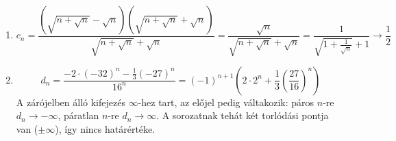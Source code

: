 \documentclass[11pt]{scrartcl}
\begin{document}
\begin{enumerate}
	\item \[
		      c_n
		      = \frac{\left(\sqrt{n + \sqrt{n}} - \sqrt{n}\right)\left(\sqrt{n + \sqrt{n}} + \sqrt{n}\right)}{\sqrt{n + \sqrt{n}} + \sqrt{n}}
		      = \frac{\sqrt{n}}{\sqrt{n + \sqrt{n}} + \sqrt{n}}
		      = \frac{1}{\sqrt{1 + \frac{1}{\sqrt{n}}} + 1}
		      \to \frac{1}{2}
	      \]

	\item \[
		      d_n
		      = \frac{-2 \cdot (-32)^n - \frac{1}{3} (-27)^n}{16^n}
		      = (-1)^{n + 1} \left( 2 \cdot 2^n + \frac{1}{3} \left(\frac{27}{16}\right)^n \right)
	      \]
	      A zárójelben álló kifejezés $\infty$-hez tart, az előjel pedig
	      váltakozik: páros $n$-re $d_n \to -\infty$, páratlan $n$-re
	      $d_n \to \infty$. A sorozatnak tehát két torlódási pontja van
	      ($\pm \infty$), így nincs határértéke.
\end{enumerate}
\end{document}
